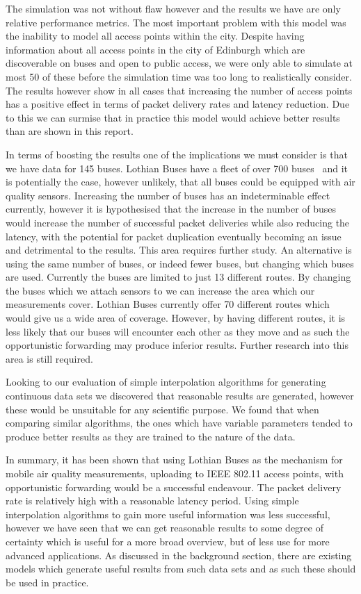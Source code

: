 The simulation was not without flaw however and the results we have are only relative performance metrics. The most important problem with this model was the inability to model all access points within the city. Despite having information about all access points in the city of Edinburgh which are discoverable on buses and open to public access, we were only able to simulate at most 50 of these before the simulation time was too long to realistically consider. The results however show in all cases that increasing the number of access points has a positive effect in terms of packet delivery rates and latency reduction. Due to this we can surmise that in practice this model would achieve better results than are shown in this report. 

In terms of boosting the results one of the implications we must consider is that we have data for 145 buses. Lothian Buses have a fleet of over 700 buses~\cite{lothianbusannualreport} and it is potentially the case, however unlikely, that all buses could be equipped with air quality sensors. Increasing the number of buses has an indeterminable effect currently, however it is hypothesised that the increase in the number of buses would increase the number of successful packet deliveries while also reducing the latency, with the potential for packet duplication eventually becoming an issue and detrimental to the results. This area requires further study. An alternative is using the same number of buses, or indeed fewer buses, but changing which buses are used. Currently the buses are limited to just 13 different routes. By changing the buses which we attach sensors to we can increase the area which our measurements cover. Lothian Buses currently offer 70 different routes which would give us a wide area of coverage. However, by having different routes, it is less likely that our buses will encounter each other as they move and as such the opportunistic forwarding may produce inferior results. Further research into this area is still required.

Looking to our evaluation of simple interpolation algorithms for generating continuous data sets we discovered that reasonable results are generated, however these would be unsuitable for any scientific purpose. We found that when comparing similar algorithms, the ones which have variable parameters tended to produce better results as they are trained to the nature of the data. 


In summary, it has been shown that using Lothian Buses as the mechanism for mobile air quality measurements, uploading to IEEE 802.11 access points, with opportunistic forwarding would be a successful endeavour. The packet delivery rate is relatively high with a reasonable latency period. Using simple interpolation algorithms to gain more useful information was less successful, however we have seen that we can get reasonable results to some degree of certainty which is useful for a more broad overview, but of less use for more advanced applications. As discussed in the background section, there are existing models which generate useful results from such data sets and as such these should be used in practice. 

